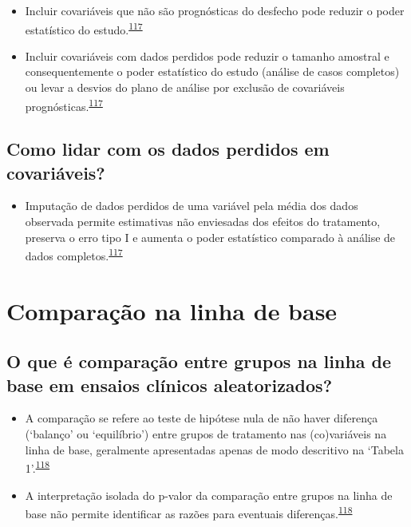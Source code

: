 \documentclass[
]{book}
\providecommand{\tightlist}{%
  \setlength{\itemsep}{0pt}\setlength{\parskip}{0pt}}
\begin{document}
\begin{itemize}
\item
  Incluir covariáveis que não são prognósticas do desfecho pode reduzir o poder estatístico do estudo.\textsuperscript{\protect\hyperlink{ref-Kahan2014}{117}}
\item
  Incluir covariáveis com dados perdidos pode reduzir o tamanho amostral e consequentemente o poder estatístico do estudo (análise de casos completos) ou levar a desvios do plano de análise por exclusão de covariáveis prognósticas.\textsuperscript{\protect\hyperlink{ref-Kahan2014}{117}}
\end{itemize}

\hypertarget{como-lidar-com-os-dados-perdidos-em-covariuxe1veis}{%
\subsection{Como lidar com os dados perdidos em covariáveis?}\label{como-lidar-com-os-dados-perdidos-em-covariuxe1veis}}

\begin{itemize}
\tightlist
\item
  Imputação de dados perdidos de uma variável pela média dos dados observada permite estimativas não enviesadas dos efeitos do tratamento, preserva o erro tipo I e aumenta o poder estatístico comparado à análise de dados completos.\textsuperscript{\protect\hyperlink{ref-Kahan2014}{117}}
\end{itemize}

\hypertarget{comparacao-linha-de-base}{%
\section{Comparação na linha de base}\label{comparacao-linha-de-base}}

\hypertarget{o-que-uxe9-comparauxe7uxe3o-entre-grupos-na-linha-de-base-em-ensaios-cluxednicos-aleatorizados}{%
\subsection{O que é comparação entre grupos na linha de base em ensaios clínicos aleatorizados?}\label{o-que-uxe9-comparauxe7uxe3o-entre-grupos-na-linha-de-base-em-ensaios-cluxednicos-aleatorizados}}

\begin{itemize}
\item
  A comparação se refere ao teste de hipótese nula de não haver diferença (`balanço' ou `equilíbrio') entre grupos de tratamento nas (co)variáveis na linha de base, geralmente apresentadas apenas de modo descritivo na `Tabela 1'.\textsuperscript{\protect\hyperlink{ref-Stang2018}{118}}
\item
  A interpretação isolada do p-valor da comparação entre grupos na linha de base não permite identificar as razões para eventuais diferenças.\textsuperscript{\protect\hyperlink{ref-Stang2018}{118}}
\end{itemize}
\end{document}

